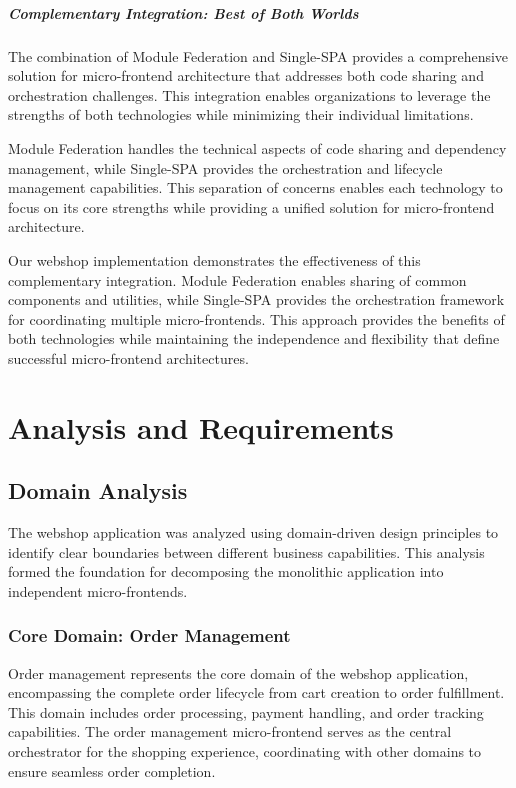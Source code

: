 \documentclass[12pt,a4paper]{report}
\begin{document}
\paragraph{Complementary Integration: Best of Both Worlds}

The combination of Module Federation and Single-SPA provides a comprehensive solution for micro-frontend architecture that addresses both code sharing and orchestration challenges. This integration enables organizations to leverage the strengths of both technologies while minimizing their individual limitations.

Module Federation handles the technical aspects of code sharing and dependency management, while Single-SPA provides the orchestration and lifecycle management capabilities. This separation of concerns enables each technology to focus on its core strengths while providing a unified solution for micro-frontend architecture.

Our webshop implementation demonstrates the effectiveness of this complementary integration. Module Federation enables sharing of common components and utilities, while Single-SPA provides the orchestration framework for coordinating multiple micro-frontends. This approach provides the benefits of both technologies while maintaining the independence and flexibility that define successful micro-frontend architectures.

\chapter{Analysis and Requirements}
\section{Domain Analysis}

The webshop application was analyzed using domain-driven design principles to identify clear boundaries between different business capabilities. This analysis formed the foundation for decomposing the monolithic application into independent micro-frontends.

\subsection{Core Domain: Order Management}

Order management represents the core domain of the webshop application, encompassing the complete order lifecycle from cart creation to order fulfillment. This domain includes order processing, payment handling, and order tracking capabilities. The order management micro-frontend serves as the central orchestrator for the shopping experience, coordinating with other domains to ensure seamless order completion.
\end{document}
